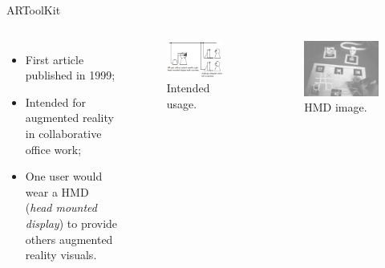 \documentclass[10pt]{beamer}
\begin{document}
\begin{frame}[fragile]{ARToolKit}
  \begin{columns}
    \begin{itemize}
      \item First article published in 1999;
      \item Intended for augmented reality in collaborative office work;
      \item One user would wear a HMD (\emph{head mounted display}) to provide others augmented reality visuals.
    \end{itemize}
      \begin{figure}
        \includegraphics[scale=0.35]{1999-sysoverview}
        \caption{Intended usage.}
      \end{figure}
      \begin{figure}
        \includegraphics[scale=0.25]{1999-virtboard}
        \caption{HMD image.}
      \end{figure}
  \end{columns}


\end{frame}
\end{document}
